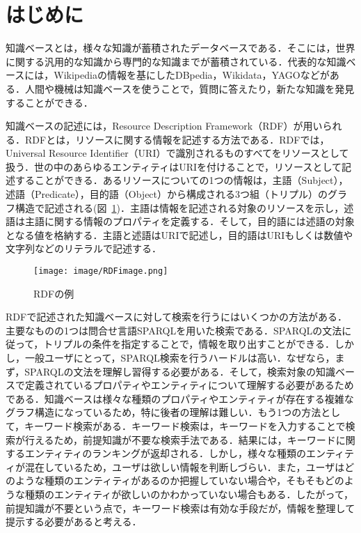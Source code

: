 \section{はじめに}
\label{sec:introduction}
知識ベースとは，様々な知識が蓄積されたデータベースである．そこには，世界に関する汎用的な知識から専門的な知識までが蓄積されている．代表的な知識ベースには，Wikipediaの情報を基にしたDBpedia，Wikidata，YAGOなどがある．人間や機械は知識ベースを使うことで，質問に答えたり，新たな知識を発見することができる．

知識ベースの記述には，Resource Description Framework（RDF）が用いられる．RDFとは，リソースに関する情報を記述する方法である．RDFでは，Universal Resource Identifier（URI）で識別されるものすべてをリソースとして扱う．世の中のあらゆるエンティティはURIを付けることで，リソースとして記述することができる．あるリソースについての1つの情報は，主語（Subject），述語（Predicate），目的語（Object）から構成される3つ組（トリプル）のグラフ構造で記述される(図~\ref{fig:RDFimage})．主語は情報を記述される対象のリソースを示し，述語は主語に関する情報のプロパティを定義する．そして，目的語には述語の対象となる値を格納する．主語と述語はURIで記述し，目的語はURIもしくは数値や文字列などのリテラルで記述する．
%
\begin{figure}[h]
\centering
\texttt{[image: image/RDFimage.png]}
\caption{\small
RDFの例
}
\label{fig:RDFimage}
\end{figure}
%

RDFで記述された知識ベースに対して検索を行うにはいくつかの方法がある．主要なものの1つは問合せ言語SPARQLを用いた検索である．SPARQLの文法に従って，トリプルの条件を指定することで，情報を取り出すことができる．しかし，一般ユーザにとって，SPARQL検索を行うハードルは高い．なぜなら，まず，SPARQLの文法を理解し習得する必要がある．そして，検索対象の知識ベースで定義されているプロパティやエンティティについて理解する必要があるためである．知識ベースは様々な種類のプロパティやエンティティが存在する複雑なグラフ構造になっているため，特に後者の理解は難しい．もう1つの方法として，キーワード検索がある．キーワード検索は，キーワードを入力することで検索が行えるため，前提知識が不要な検索手法である．結果には，キーワードに関するエンティティのランキングが返却される．しかし，様々な種類のエンティティが混在しているため，ユーザは欲しい情報を判断しづらい．また，ユーザはどのような種類のエンティティがあるのか把握していない場合や，そもそもどのような種類のエンティティが欲しいのかわかっていない場合もある．したがって，前提知識が不要という点で，キーワード検索は有効な手段だが，情報を整理して提示する必要があると考える．

